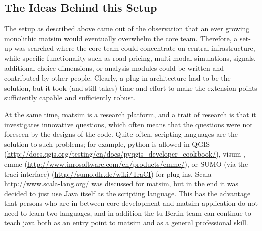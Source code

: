 
\subsection{The Ideas Behind this Setup}
The setup as described above came out of the observation that an ever growing monolithic \gls{matsim} would eventually overwhelm the core team. Therefore, a set-up was searched where the core team could concentrate on central infrastructure, while specific functionality such as road pricing, multi-modal simulations, signals, additional choice dimensions, or analysis modules could be written and contributed by other people. Clearly, a plug-in architecture had to be the solution, but it took (and still takes) time and effort to make the extension points sufficiently capable and sufficiently robust.  

At the same time, \gls{matsim} is a research platform, and a trait of research is that it investigates innovative questions, which often means that the questions were not foreseen by the designs of the code. 
Quite often, scripting languages are the solution to such problems; 
for example, python is allowed in QGIS (\url{http://docs.qgis.org/testing/en/docs/pyqgis_developer_cookbook/}), 
\gls{visum} \citep{VISUM_manualNewFeatures_2011},
\gls{emme} (\url{http://www.inrosoftware.com/en/products/emme/}), or 
SUMO (via the traci interface) (\url{http://sumo.dlr.de/wiki/TraCI}) 
for plug-ins.
Scala \url{http://www.scala-lang.org/}
was discussed for \gls{matsim}, but in the end it was decided to just use Java itself as the scripting language. 
This has the advantage that persons who are in between core development and \gls{matsim} application do not need to learn two languages, and in addition the \gls{tu} Berlin team can continue to teach \gls{java} both as an entry point to \gls{matsim} and as a general professional skill.

